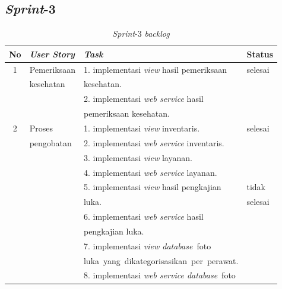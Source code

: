 \subsection{\emph{Sprint}-3}
\begin{table}[H]
	\centering
	\caption{\emph{Sprint}-3 \emph{backlog}}
	\label{tabel_input}
	\begin{tabular}{|c|l|l|l|}
		\hline
		\textbf{No} & \textbf{\emph{User Story}} & \textbf{\emph{Task}} &
		\textbf{Status}\\
		\hline
		
		1 & 
		Pemeriksaan & 
		1. implementasi \emph{view} hasil pemeriksaan &
		selesai\\
		
		& 
		kesehatan & 
		kesehatan.&
		\\
		
		& 
		& 
		2. implementasi \emph{web service} hasil&
		\\
		
		& 
		& 
		pemeriksaan kesehatan.&
		\\
		\hline
		
		2 & 
		Proses & 
		1. implementasi \emph{view} inventaris.&
		selesai\\
		
		& 
		pengobatan& 
		2. implementasi \emph{web service} inventaris.&
		\\
		
		& 
		& 
		3. implementasi \emph{view} layanan.
		&\\
		
		& 
		& 
		4. implementasi \emph{web service} layanan.&
		\\
		
		& 
		& 
		5. implementasi \emph{view} hasil pengkajian&
		tidak\\
		
		& 
		& 
		luka.&
		selesai\\
		
		
		& 
		& 
		6. implementasi \emph{web service} hasil&
		\\
		
		& 
		& 
		pengkajian luka.&
		\\
		
		& 
		& 
		7. implementasi \emph{view database} foto&
		\\
		
		& 
		& 
		luka yang dikategorisasikan per perawat.&
		\\
		
		& 
		& 
		8. implementasi \emph{web service database} foto&
		\\
		

\end{tabular}
\end{table}
